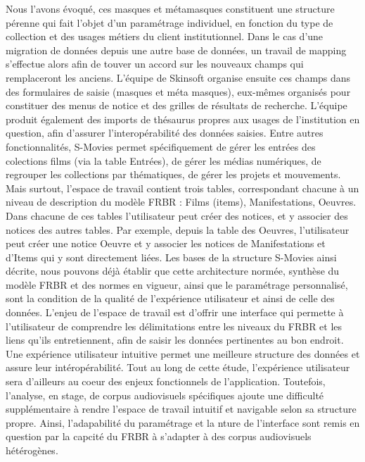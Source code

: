 Nous l'avons évoqué, ces masques et métamasques constituent une structure pérenne qui fait l'objet d'un paramétrage individuel, en fonction du type de collection et des usages métiers du client institutionnel. Dans le cas d'une migration de données depuis une autre base de données, un travail de mapping s'effectue alors afin de touver un accord sur les nouveaux champs qui remplaceront les anciens. L'équipe de Skinsoft organise ensuite ces champs dans des formulaires de saisie (masques et méta masques), eux-mêmes organisés pour constituer des menus de notice et des grilles de résultats de recherche. L'équipe produit également des imports de thésaurus propres aux usages de l'institution en question, afin d'assurer l'interopérabilité des données saisies.
Entre autres fonctionnalités, S-Movies permet spécifiquement de gérer les entrées des colections films (via la table Entrées), de gérer les médias numériques, de regrouper les collections par thématiques, de gérer les projets et mouvements. Mais surtout, l'espace de travail contient trois tables, correspondant chacune à un niveau de description du modèle FRBR : Films (items), Manifestations, Oeuvres. Dans chacune de ces tables l'utilisateur peut créer des notices, et y associer des notices des autres tables. Par exemple, depuis la table des Oeuvres, l'utilisateur peut créer une notice Oeuvre et y associer les notices de Manifestations et d'Items qui y sont directement liées.
Les bases de la structure S-Movies ainsi décrite, nous pouvons déjà établir que cette architecture normée, synthèse du modèle FRBR et des normes en vigueur, ainsi que le paramétrage personnalisé, sont la condition de la qualité de l'expérience utilisateur et ainsi de celle des données. L'enjeu de l'espace de travail est d'offrir une interface qui permette à l'utilisateur de comprendre les délimitations entre les niveaux du FRBR et les liens qu'ils entretiennent, afin de saisir les données pertinentes au bon endroit. Une expérience utilisateur intuitive permet une meilleure structure des données et assure leur intéropérabilité. Tout au long de cette étude, l'expérience utilisateur sera d'ailleurs au coeur des enjeux fonctionnels de l'application. Toutefois, l'analyse, en stage, de corpus audiovisuels spécifiques ajoute une difficulté supplémentaire à rendre l'espace de travail intuitif et navigable selon sa structure propre. 
Ainsi, l'adapabilité du paramétrage et la nture de l'interface sont remis en question par la capcité du FRBR à s'adapter à des corpus audiovisuels hétérogènes. 

